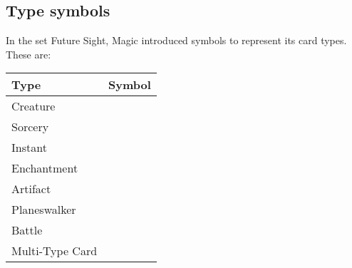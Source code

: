 \documentclass[a4paper]{scrartcl}
\begin{document}
	\subsection*{Type symbols}

	In the set Future Sight, Magic introduced symbols to represent its card types.
	These are:
	\begin{table}[h]
		\begin{tabular}{l c}
			\hline
			\textbf{Type} & \textbf{Symbol} \\
			\hline
			Creature & \mtgTypeCreature \\
			Sorcery & \mtgTypeSorcery \\
			Instant & \mtgTypeInstant \\
			Enchantment & \mtgTypeEnchantment \\
			Artifact & \mtgTypeArtifact \\
			Planeswalker & \mtgTypePlaneswalker \\
			Battle & \mtgTypeBattle \\
			Multi-Type Card & \mtgTypeMulti \\
			\hline
		\end{tabular}
	\end{table}
\end{document}
